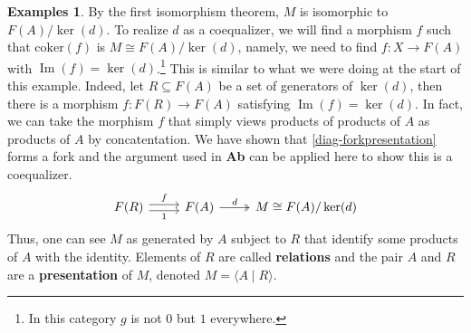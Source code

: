 \documentclass{article}
\theoremstyle{definition}
\newtheorem{exmps}[thm]{Examples}
\theoremstyle{remark}
\DeclareMathOperator{\im}{Im}
\begin{document}
\begin{exmps}
    By the first isomorphism theorem, $M$ is isomorphic to $F(A)/\ker(d)$. To realize $d$ as a coequalizer, we will find a morphism $f$ such that $\text{coker}(f)$ is $M \cong F(A)/\ker(d)$, namely, we need to find $f: X \rightarrow F(A)$ with $\im(f) = \ker(d)$.\footnote{In this category $g$ is not $0$ but $1$ everywhere.} This is similar to what we were doing at the start of this example. Indeed, let $R \subseteq F(A)$ be a set of generators of $\ker(d)$, then there is a morphism $f: F(R) \rightarrow F(A)$ satisfying $\im(f) = \ker(d)$. In fact, we can take the morphism $f$ that simply views products of products of $A$ as products of $A$ by concatentation. We have shown that \eqref{diag-forkpresentation} forms a fork and the argument used in \textbf{Ab} can be applied here to show this is a coequalizer.
    \begin{equation}\label{diag-forkpresentation}
        \begin{tikzcd}
            F(R) \arrow[r, "f", shift left] \arrow[r, "1"', shift right] & F(A) \arrow[r, two heads, "d"] & M\cong F(A)/\ker(d)
        \end{tikzcd}
    \end{equation}
    Thus, one can see $M$ as generated by $A$ subject to $R$ that identify some products of $A$ with the identity. Elements of $R$ are called \textbf{relations} and the pair $A$ and $R$ are a \textbf{presentation} of $M$, denoted $M = \langle A \mid R \rangle$.
\end{exmps}
\end{document}

